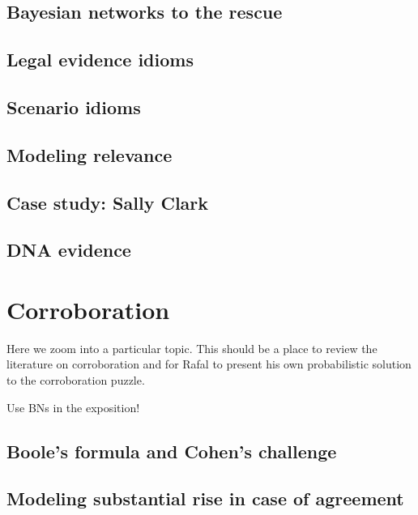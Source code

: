 \documentclass[]{book}
\begin{document}
\section{Bayesian networks to the rescue}

\section{Legal evidence idioms}

\section{Scenario idioms}

\section{Modeling relevance}

\section{Case study: Sally Clark}


\section{DNA evidence}


\chapter{Corroboration}

Here we zoom into a particular topic. This should be a
place to review the literature on corroboration and
for Rafal to present his own probabilistic solution to the corroboration puzzle.

Use BNs in the exposition!

\section{Boole's formula and Cohen's challenge}

\section{Modeling substantial rise in case of agreement}
\end{document}
